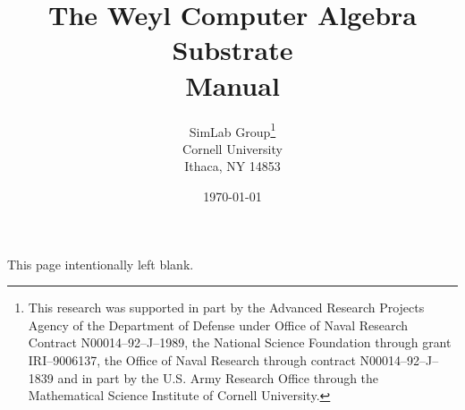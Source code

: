 



 \HideFigureFrames

%
\makeindex

%



\title{The Weyl Computer Algebra Substrate \\ Manual}

\author{SimLab Group\thanks{This research was supported in part by the
Advanced Research Projects Agency of the Department of Defense under
Office of Naval Research Contract N00014--92--J--1989, the National
Science Foundation through grant IRI--9006137, the Office of
Naval Research through contract N00014--92--J--1839 and in part by the U.S.
Army Research Office through the Mathematical Science Institute of Cornell
University.} \\ 
Cornell University \\
Ithaca, NY 14853}

\date{\today}

 
\maketitle

This page intentionally left blank.

\newpage
\setcounter{page}{1}

\tableofcontents






















